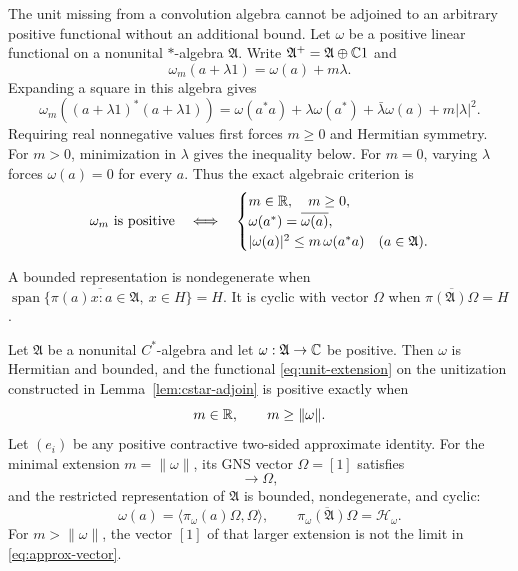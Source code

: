 The unit missing from a convolution algebra cannot be adjoined to an
arbitrary positive functional without an additional bound.  Let $\omega$
be a positive linear functional on a nonunital $*$-algebra $\mathfrak A$.
Write
$\mathfrak A^+=\mathfrak A\oplus\mathbb C1$ and
\begin{equation}
 \omega_m(a+\lambda1)=\omega(a)+m\lambda.
 \label{eq:unit-extension}
\end{equation}
Expanding a square in this algebra gives
\[
 \omega_m((a+\lambda1)^*(a+\lambda1))
 =\omega(a^*a)+\lambda\omega(a^*)+\bar\lambda\omega(a)+m|\lambda|^2.
\]
Requiring real nonnegative values first forces $m\geq0$ and Hermitian
symmetry.  For $m>0$, minimization in $\lambda$ gives the inequality below.
For $m=0$, varying $\lambda$ forces $\omega(a)=0$ for every $a$.
Thus the exact algebraic criterion is
\begin{equation}
 \omega_m\text{ is positive}
 \quad\Longleftrightarrow\quad
 \begin{cases}
 m\in\mathbb R,\quad m\geq0,\\
 \omega(a^*)=\overline{\omega(a)},\\
 |\omega(a)|^2\leq m\,\omega(a^*a)&(a\in\mathfrak A).
 \end{cases}
 \label{eq:unit-criterion}
\end{equation}

A bounded representation is nondegenerate when
$\overline{\operatorname{span}\{\pi(a)x:a\in\mathfrak A,\ x\in H\}}=H$.
It is cyclic with vector $\Omega$ when
$\overline{\pi(\mathfrak A)\Omega}=H$.

\begin{theorem}
Let\label{thm:cstar-unitization} $\mathfrak A$ be a nonunital $C^*$-algebra and let
$\omega:\mathfrak A\to\mathbb C$ be positive.  Then $\omega$ is Hermitian and
bounded, and the functional \eqref{eq:unit-extension} on the unitization
constructed in Lemma~\ref{lem:cstar-adjoin} is positive exactly when
\begin{equation}
 m\in\mathbb R,\qquad m\geq\|\omega\|.
 \label{eq:minimal-mass}
\end{equation}
Let $(e_i)$ be any positive contractive two-sided approximate identity.
For the minimal extension $m=\|\omega\|$, its GNS vector
$\Omega=[1]$ satisfies
\begin{equation}
 [e_i]\longrightarrow\Omega,
 \label{eq:approx-vector}
\end{equation}
and the restricted representation of $\mathfrak A$ is bounded,
nondegenerate, and cyclic:
\begin{equation}
 \omega(a)=\langle\pi_\omega(a)\Omega,\Omega\rangle,
 \qquad
 \overline{\pi_\omega(\mathfrak A)\Omega}=\mathcal H_\omega.
 \label{eq:cyclic-vector}
\end{equation}
For $m>\|\omega\|$, the vector $[1]$ of that larger extension is not the
limit in \eqref{eq:approx-vector}.
\end{theorem}

